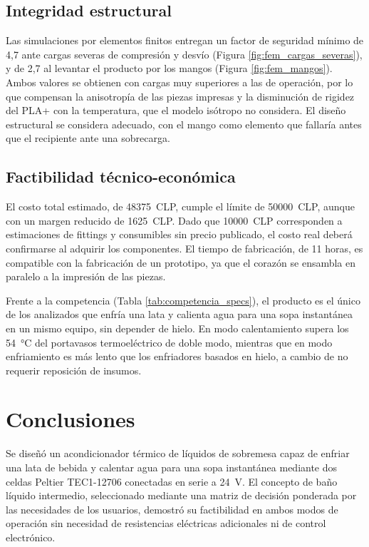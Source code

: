 \documentclass[12pt, a4paper]{article}
\begin{document}
\subsection{Integridad estructural}

Las simulaciones por elementos finitos entregan un factor de seguridad mínimo de 4,7 ante cargas severas de compresión y desvío (Figura \ref{fig:fem_cargas_severas}), y de 2,7 al levantar el producto por los mangos (Figura \ref{fig:fem_mangos}). Ambos valores se obtienen con cargas muy superiores a las de operación, por lo que compensan la anisotropía de las piezas impresas y la disminución de rigidez del PLA+ con la temperatura, que el modelo isótropo no considera. El diseño estructural se considera adecuado, con el mango como elemento que fallaría antes que el recipiente ante una sobrecarga.

\subsection{Factibilidad técnico-económica}

El costo total estimado, de \num{48375}~CLP, cumple el límite de \num{50000}~CLP, aunque con un margen reducido de \num{1625}~CLP. Dado que \num{10000}~CLP corresponden a estimaciones de fittings y consumibles sin precio publicado, el costo real deberá confirmarse al adquirir los componentes. El tiempo de fabricación, de 11 horas, es compatible con la fabricación de un prototipo, ya que el corazón se ensambla en paralelo a la impresión de las piezas.

Frente a la competencia (Tabla \ref{tab:competencia_specs}), el producto es el único de los analizados que enfría una lata y calienta agua para una sopa instantánea en un mismo equipo, sin depender de hielo. En modo calentamiento supera los \SI{54}{\celsius} del portavasos termoeléctrico de doble modo, mientras que en modo enfriamiento es más lento que los enfriadores basados en hielo, a cambio de no requerir reposición de insumos.

\section{Conclusiones}
\label{sec:conclusiones}

Se diseñó un acondicionador térmico de líquidos de sobremesa capaz de enfriar una lata de bebida y calentar agua para una sopa instantánea mediante dos celdas Peltier TEC1-12706 conectadas en serie a \SI{24}{\volt}. El concepto de baño líquido intermedio, seleccionado mediante una matriz de decisión ponderada por las necesidades de los usuarios, demostró su factibilidad en ambos modos de operación sin necesidad de resistencias eléctricas adicionales ni de control electrónico.
\end{document}
